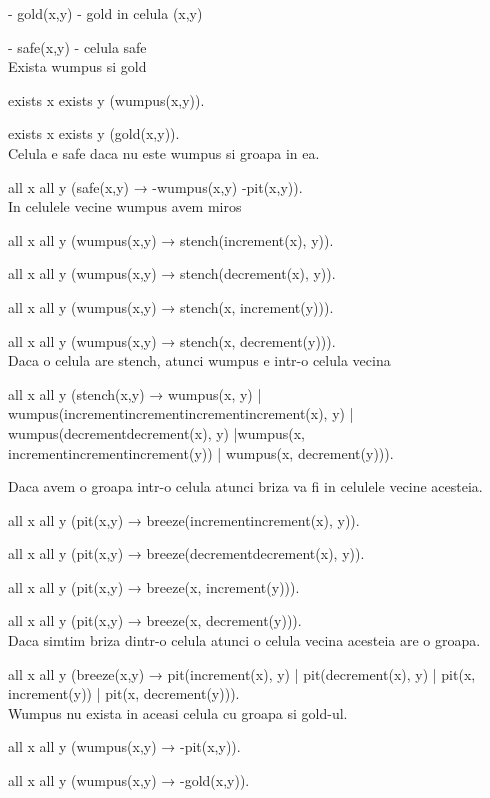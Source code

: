 \documentclass[a4paper,12pt]{report}
\begin{document}
- gold(x,y) - gold in celula (x,y)

- safe(x,y) - celula safe
\\

Exista wumpus si gold

exists x exists y (wumpus(x,y)).

exists x exists y (gold(x,y)).
\\

Celula e safe daca nu este wumpus si groapa in ea.

all x all y (safe(x,y) → -wumpus(x,y) -pit(x,y)).
\\

In celulele vecine wumpus avem miros

all x all y (wumpus(x,y) → stench(increment(x), y)).

all x all y (wumpus(x,y) → stench(decrement(x), y)).

all x all y (wumpus(x,y) → stench(x, increment(y))).

all x all y (wumpus(x,y) → stench(x, decrement(y))).
\\

Daca o celula are stench, atunci wumpus e intr-o celula vecina

all x all y (stench(x,y) → wumpus(x, y) | wumpus(incrementincrementincrementincrement(x), y) | wumpus(decrementdecrement(x), y) |wumpus(x, incrementincrementincrement(y)) | wumpus(x, decrement(y))).

Daca avem o groapa intr-o celula atunci briza va fi in celulele vecine acesteia.

all x all y (pit(x,y) → breeze(incrementincrement(x), y)).

all x all y (pit(x,y) → breeze(decrementdecrement(x), y)).

all x all y (pit(x,y) → breeze(x, increment(y))).

all x all y (pit(x,y) → breeze(x, decrement(y))).
\\

Daca simtim briza dintr-o celula atunci o celula vecina acesteia are o groapa.

all x all y (breeze(x,y) → pit(increment(x), y) | pit(decrement(x), y) | pit(x, increment(y)) | pit(x, decrement(y))).
\\

Wumpus nu exista in aceasi celula cu groapa si gold-ul.

all x all y (wumpus(x,y) → -pit(x,y)).

all x all y (wumpus(x,y) → -gold(x,y)).
\end{document}
